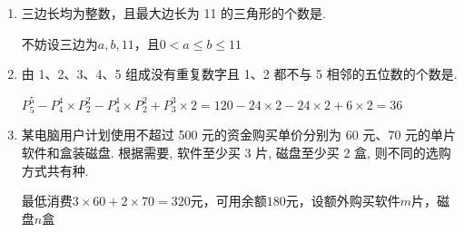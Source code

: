 \begin{enumerate}
    \item 三边长均为整数，且最大边长为 11 的三角形的个数是.
    \begin{jieda}
        不妨设三边为$a, b, 11$，且$0 < a \leq b \leq 11$
    \end{jieda}

    \item 由 1、2、3、4、5 组成没有重复数字且 1、2 都不与 5 相邻的五位数的个数是.
    \begin{jieda}
        $P_5^5 - P_4^4 \times P_2^2 - P_4^4 \times P_2^2 + P^3_3 \times 2 = 120-24\times2-24\times2+6\times2 = 36$
    \end{jieda}

    \item 某电脑用户计划使用不超过 500 元的资金购买单价分别为 60 元、70 元的单片软件和盒装磁盘. 根据需要, 软件至少买 3 片, 磁盘至少买 2 盒, 则不同的选购方式共有种.
    \begin{jieda}
        最低消费$3 \times 60 + 2 \times 70 = 320$元，可用余额$180$元，设额外购买软件$m$片，磁盘$n$盒
    \end{jieda}


\end{enumerate}
